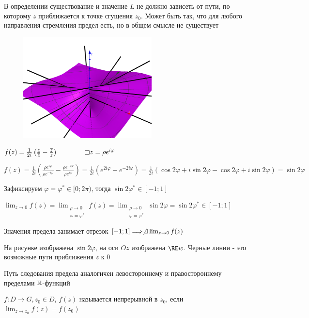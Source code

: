 \documentclass[12pt]{article}
\begin{document}
В определении существование и значение $L$ не должно зависеть от пути, по которому $z$ приближается к точке сгущения $z_0$.
Может быть так, что для любого направления стремления предел есть, но в общем смысле не существует


\begin{figure}
    \includegraphics[width=7cm]{addchapters2/images/addchapters2_2025_02_21_2}
\end{figure}

\Ex $f(z) = \frac{1}{2i} \left(\frac{z}{\overline{z}} - \frac{\overline{z}}{z}\right) \qquad\qquad \mathord{\sqsupset} z = \rho e^{i\varphi}$

$f(z) = \frac{1}{2i} \left(\frac{\rho e^{i\varphi}}{\rho e^{-i\varphi}} - \frac{\rho e^{-i\varphi}}{\rho e^{i\varphi}}\right) =
\frac{1}{2i} \left(e^{2i\varphi} - e^{-2i\varphi}\right) = \frac{1}{2i} (\cos 2\varphi + i\sin 2\varphi - \cos 2\varphi + i\sin 2\varphi) = \sin 2\varphi$

Зафиксируем $\varphi = \varphi^* \in [0; 2\pi)$, тогда $\sin 2\varphi^* \in [-1; 1]$

$\lim_{z \to 0} f(z) = \lim_{\substack{\rho \to 0 \\ \varphi = \varphi^*}} f(z) = 
\lim_{\substack{\rho \to 0 \\ \varphi = \varphi^*}} \sin 2\varphi = \sin 2\varphi^* \in [-1; 1]$

Значения предела занимает отрезок $[-1; 1] \Longrightarrow \not\exists \lim_{z \to 0} f(z)$

На рисунке изображена $\sin 2\varphi$, на оси $Oz$ изображена $\RE w$. Черные линии - это возможные пути приближения $z$ к $0$

\Nota Путь следования предела аналогичен левостороннему и правостороннему пределами $\mathbb{R}$-функций


$f : D \longrightarrow G, z_0 \in D$, $f(z)$ называется непрерывной в $z_0$, если $\lim_{z \to z_0} f(z) = f(z_0)$
\end{document}
